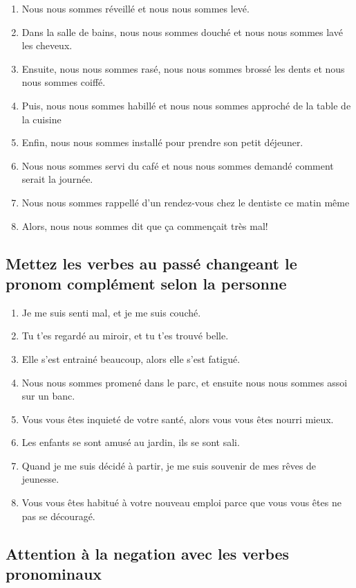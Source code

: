 \begin{enumerate}
    \item Nous nous sommes réveillé et nous nous sommes levé.
    \item Dans la salle de bains, nous nous sommes douché et nous nous sommes lavé les cheveux.
    \item Ensuite, nous nous sommes rasé, nous nous sommes brossé les dents et nous nous sommes coiffé.
    \item Puis, nous nous sommes habillé et nous nous sommes approché de la table de la cuisine
    \item Enfin, nous nous sommes installé pour prendre son petit déjeuner.
    \item Nous nous sommes servi du café et nous nous sommes demandé comment serait la journée.
    \item Nous nous sommes rappellé d'un rendez-vous chez le dentiste ce matin même
    \item Alors, nous nous sommes dit que ça commençait très mal!
\end{enumerate}

\subsection{Mettez les verbes au passé changeant le pronom complément selon la personne}

\begin{enumerate}
    \item Je me suis senti mal, et je me suis couché.
    \item Tu t'es regardé au miroir, et tu t'es trouvé belle.
    \item Elle s'est entrainé beaucoup, alors elle s'est fatigué.
    \item Nous nous sommes promené dans le parc, et ensuite nous nous sommes assoi sur un banc.
    \item Vous vous êtes inquieté de votre santé, alors vous vous êtes nourri mieux.
    \item Les enfants se sont amusé au jardin, ils se sont sali.
    \item Quand je me suis décidé à partir, je me suis souvenir de mes rêves de jeunesse.
    \item Vous vous êtes habitué à votre nouveau emploi parce que vous vous êtes ne pas se découragé.
\end{enumerate}

\subsection{Attention à la negation avec les verbes pronominaux}

